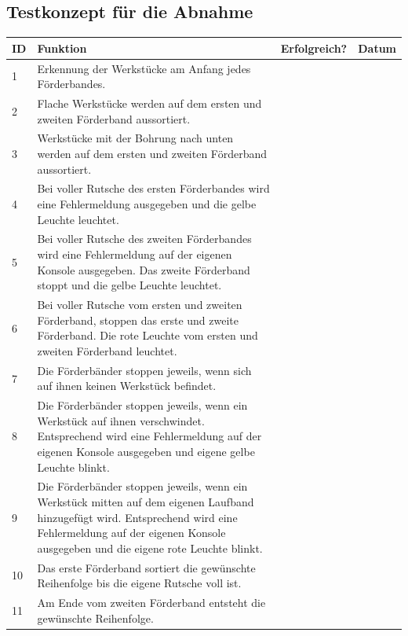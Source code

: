 \documentclass[a4paper, 11pt]{article}
\begin{document}
\subsection{Testkonzept für die Abnahme} 
\begin{table}[H]
\center
    \begin{tabularx}{\textwidth}{|l|X|l|l|}
        \hline
        \textbf{ID}&\textbf{Funktion}&\textbf{Erfolgreich?}&\textbf{Datum}\\
        \hline
        1&Erkennung der Werkstücke am Anfang jedes Förderbandes.&&\\
        \hline
        2&Flache Werkstücke werden auf dem ersten und zweiten Förderband aussortiert.&&\\
        \hline
        3&Werkstücke mit der Bohrung nach unten werden auf dem ersten und zweiten Förderband 
        aussortiert.&&\\
        \hline
        4&Bei voller Rutsche des ersten Förderbandes wird eine Fehlermeldung ausgegeben	und die gelbe 
        Leuchte leuchtet.&&\\
        \hline
        5&Bei voller Rutsche des zweiten Förderbandes wird eine Fehlermeldung auf der eigenen Konsole 
        ausgegeben. Das zweite Förderband stoppt und die gelbe Leuchte leuchtet.&&\\
        \hline
        6&Bei voller Rutsche vom ersten und zweiten Förderband, stoppen das erste und zweite Förderband. 
        Die rote Leuchte vom ersten und zweiten Förderband leuchtet.&&\\
        \hline
        7&Die Förderbänder stoppen jeweils, wenn sich auf ihnen keinen Werkstück befindet.&&\\
        \hline
        8&Die Förderbänder stoppen jeweils, wenn ein Werkstück auf ihnen verschwindet. Entsprechend wird 
        eine Fehlermeldung auf der eigenen Konsole ausgegeben und eigene gelbe Leuchte blinkt.&&\\
        \hline
        9&Die Förderbänder stoppen jeweils, wenn ein Werkstück mitten auf dem eigenen Laufband hinzugefügt 
        wird. Entsprechend wird eine Fehlermeldung auf der eigenen Konsole ausgegeben und die eigene rote 
        Leuchte blinkt.&&\\
        \hline
        10&Das erste Förderband sortiert die gewünschte Reihenfolge bis die eigene Rutsche voll ist.&&\\
        \hline
        11&Am Ende vom zweiten Förderband entsteht die gewünschte Reihenfolge.&&\\
        \hline

\end{tabularx}
\end{table}
\end{document}

